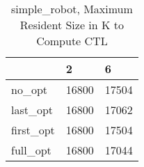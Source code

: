 \begin{table}
\caption{simple\_robot, Maximum Resident Size in K to Compute CTL}
\label{simple_robot_CTL_size}
\begin{tabular}{lll}
\toprule
 & 2 & 6 \\
\midrule
no\_opt & 16800 & 17504 \\
last\_opt & 16800 & 17062 \\
first\_opt & 16800 & 17504 \\
full\_opt & 16800 & 17044 \\
\bottomrule
\end{tabular}
\end{table}
